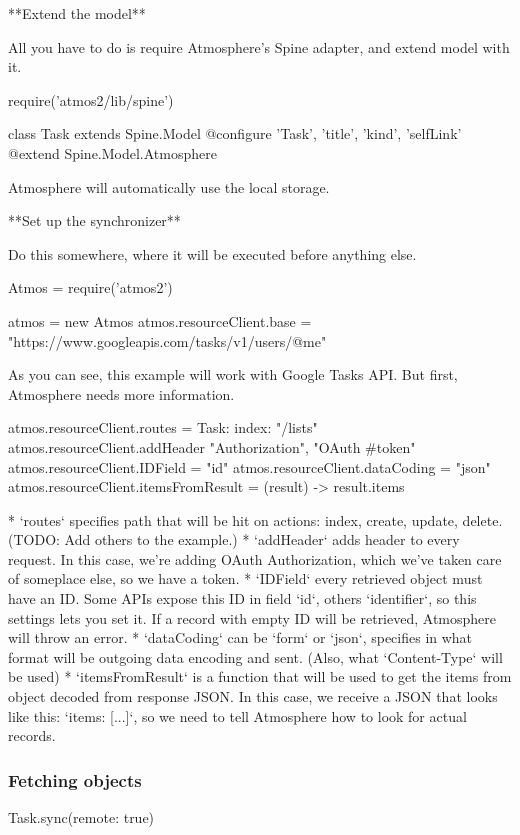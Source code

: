 **Extend the model**

All you have to do is require Atmosphere's Spine adapter, and extend model with it.

    require('atmos2/lib/spine')
    
    class Task extends Spine.Model
      @configure 'Task', 'title', 'kind', 'selfLink'
      @extend Spine.Model.Atmosphere

Atmosphere will automatically use the local storage.

**Set up the synchronizer**

Do this somewhere, where it will be executed before anything else.

    Atmos = require('atmos2')
    
    atmos = new Atmos
    atmos.resourceClient.base = "https://www.googleapis.com/tasks/v1/users/@me"

As you can see, this example will work with Google Tasks API. But first, Atmosphere needs more information.

    atmos.resourceClient.routes =
      Task:
        index: "/lists"
    atmos.resourceClient.addHeader "Authorization", "OAuth #{token}"
    atmos.resourceClient.IDField = "id"
    atmos.resourceClient.dataCoding = "json"
    atmos.resourceClient.itemsFromResult = (result) -> result.items
    
* `routes` specifies path that will be hit on actions: index, create, update, delete. (TODO: Add others to the example.)
* `addHeader` adds header to every request. In this case, we're adding OAuth Authorization, which we've taken care of someplace else, so we have a token.
* `IDField` every retrieved object must have an ID. Some APIs expose this ID in field `id`, others `identifier`, so this settings lets you set it. If a record with empty ID will be retrieved, Atmosphere will throw an error.
* `dataCoding` can be `form` or `json`, specifies in what format will be outgoing data encoding and sent. (Also, what `Content-Type` will be used)
* `itemsFromResult` is a function that will be used to get the items from object decoded from response JSON. In this case, we receive a JSON that looks like this: `{items: [...]}`, so we need to tell Atmosphere how to look for actual records.


\subsubsection{Fetching objects}

    Task.sync(remote: true)

